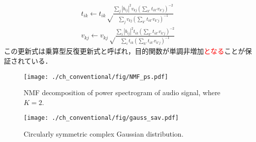 \begin{align}
    t_{ik} \leftarrow t_{ik} \sqrt \frac{ \sum_j |b_{ij}|^2 v_{kj} \left( \sum_{k'} t_{ik'} v_{k'j} \right)^{-2} }{ \sum_j v_{kj} \left( \sum_{k'} t_{ik'} v_{k'j} \right)^{-1} } \label{eq:MUT} \\
    v_{kj} \leftarrow v_{kj} \sqrt \frac{ \sum_i |b_{ij}|^2 t_{ik} \left( \sum_{k'} t_{ik'} v_{k'j} \right)^{-2} }{ \sum_i t_{ik} \left( \sum_{k'} t_{ik'} v_{k'j} \right)^{-1} } \label{eq:MUV}
\end{align}
この更新式は乗算型反復更新式と呼ばれ，目的関数が単調非増加\textcolor{red}{となる}ことが保証されている．

\begin{figure}[!t]
\centering
\texttt{[image: ./ch\_conventional/fig/NMF\_ps.pdf]}
\caption{NMF decomposition of power spectrogram of audio signal, where $K=2$.}
\label{fig:nmf_ps}
\end{figure}

\begin{figure}[!b]
\centering
\texttt{[image: ./ch\_conventional/fig/gauss\_sav.pdf]}
\caption{Circularly symmetric complex Gaussian distribution.}
\label{fig:gauss}
\end{figure}

